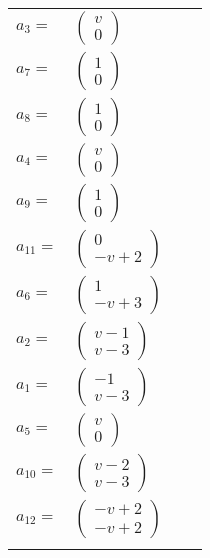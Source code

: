 \documentclass[1p]{elsarticle_modified}
\theoremstyle{definition}
\begin{document}
\begin{tabular}{m{7pt} m{180pt} m{7pt} m{180pt} }
\flushright $a_{3}=$&$\begin{pmatrix}v\\0\end{pmatrix}$ \\
\flushright $a_{7}=$&$\begin{pmatrix}1\\0\end{pmatrix}$ \\
\flushright $a_{8}=$&$\begin{pmatrix}1\\0\end{pmatrix}$ \\
\flushright $a_{4}=$&$\begin{pmatrix}v\\0\end{pmatrix}$ \\
\flushright $a_{9}=$&$\begin{pmatrix}1\\0\end{pmatrix}$ \\
\flushright $a_{11}=$&$\begin{pmatrix}0\\- v+2\end{pmatrix}$ \\
\flushright $a_{6}=$&$\begin{pmatrix}1\\- v+3\end{pmatrix}$ \\
\flushright $a_{2}=$&$\begin{pmatrix}v-1\\v-3\end{pmatrix}$ \\
\flushright $a_{1}=$&$\begin{pmatrix}-1\\v-3\end{pmatrix}$ \\
\flushright $a_{5}=$&$\begin{pmatrix}v\\0\end{pmatrix}$ \\
\flushright $a_{10}=$&$\begin{pmatrix}v-2\\v-3\end{pmatrix}$ \\
\flushright $a_{12}=$&$\begin{pmatrix}- v+2\\- v+2\end{pmatrix}$\\&\end{tabular}
\end{document}
